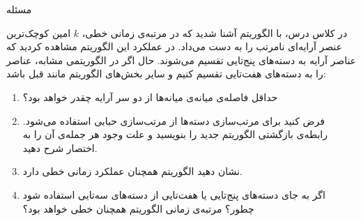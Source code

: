 ‌مسئله

در کلاس درس، با الگوریتم
آشنا شدید که در مرتبه‌ی زمانی خطی، 
$k$ 
امین کوچک‌ترین عنصر آرایه‌ای نامرتب را به دست می‌داد. در عملکرد این الگوریتم مشاهده کردید که عناصر آرایه به دسته‌های پنج‌تایی تقسیم می‌شوند. حال اگر در الگوریتمی مشابه، عناصر را به دسته‌های هفت‌تایی تقسیم کنیم و سایر بخش‌های الگوریتم مانند قبل باشد:

\begin{enumerate}[ ]
    \item 
    حداقل فاصله‌ی میانه‌ی میانه‌ها از دو سر آرایه چقدر خواهد بود؟
 
    \item 
    فرض کنید برای مرتب‌سازی دسته‌ها از مرتب‌سازی حبابی
استفاده می‌شود. رابطه‌ی بازگشتی الگوریتم جدید را بنویسید و علت وجود هر جمله‌ی آن را به اختصار شرح دهید.

\item
نشان دهید الگوریتم همچنان عملکرد زمانی خطی دارد.

\item
اگر به جای دسته‌های پنج‌تایی یا هفت‌تایی از دسته‌های سه‌تایی استفاده شود چطور؟ مرتبه‌ی زمانی الگوریتم 
همچنان خطی خواهد بود؟
\end{enumerate}
 
